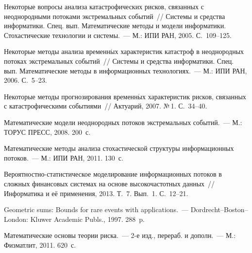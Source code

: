 \begin{multicols}{2}
\vspace*{-12pt}

{\small\frenchspacing
{%
\begin{thebibliography}{99}

 Некоторые вопросы анализа
катастрофических рисков, связанных с неоднородными потоками
экстремальных событий~// Систе\-мы и средства информатики. Спец. вып.
Математические методы и модели информатики. Стохастические
технологии и сис\-те\-мы.~--- М.: ИПИ РАН, 2005. С.~109--125.

 Некоторые методы
анализа временн$\acute{\mbox{ы}}$х характеристик катастроф в неоднородных
потоках экстремальных событий~// Сис\-те\-мы и средства информатики.
Спец. вып. Математические методы в информационных технологиях.~---
М.: ИПИ РАН, 2006. С.~5--23.

 Некоторые методы
прогнозирования временн$\acute{\mbox{ы}}$х характеристик рисков, связанных с
катастрофическими событиями~// Актуарий, 2007. №\,1. С.~34--40.

 Математические
модели неоднородных потоков экстремальных событий.~--- М.: ТОРУС
ПРЕСС, 2008. 200~с.

Математические методы анализа стохастической структуры
информационных потоков.~--- М.: ИПИ РАН, 2011. 130~с.



Ве\-ро\-ят\-но\-ст\-но-ста\-ти\-сти\-че\-ское моделирование информационных потоков в
сложных финансовых сис\-те\-мах на основе высокочастотных данных~//
Информатика и её применения, 2013. Т.~7. Вып.~1. С.~12--21.

 Geometric sums: Bounds for rare events
with applications.~--- Dordrecht--Boston--London: Kluwer Academic
Publs., 1997. 288~p.

Математические основы теории риска.~--- 2-е изд., перераб. и дополн.~--- М.: Физматлит, 2011.
620~с.


\end{thebibliography}}}
\end{multicols}
